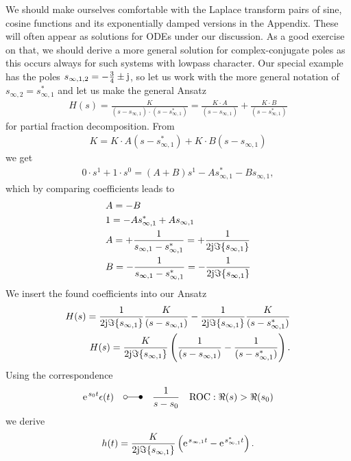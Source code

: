 \documentclass[11pt,a4paper,DIV=12]{scrartcl}
\begin{document}
We should make ourselves comfortable with the Laplace transform pairs of sine, cosine
functions and its exponentially damped versions in the Appendix.
These will often appear as solutions for ODEs under our discussion.
%
As a good exercise on that, we should derive a more general solution for
complex-conjugate poles as this occurs always for such systems
with lowpass character.
%
Our special example has the poles $s_{\infty,1,2}=-\frac{3}{4}\pm \im$, so let
us work with the more general notation of $s_{\infty,2} = s_{\infty,1}^*$
and let us make the general Ansatz
%
\begin{align}
H(s)
= \frac{K}{(s-s_{\infty,1}) \cdot (s-s_{\infty,1}^*)}
= \frac{K\cdot A}{(s-s_{\infty,1})} + \frac{K \cdot B}{(s-s_{\infty,1}^*)}
\end{align}
%
for partial fraction decomposition.
%
From
%
\begin{align}
K = K \cdot A (s-s_{\infty,1}^*) + K \cdot B (s-s_{\infty,1})
\end{align}
%
we get
\begin{align}
0 \cdot s^1 + 1 \cdot s^0=  (A+B) s^1 - A s_{\infty,1}^* - B s_{\infty,1},
\end{align}
which by comparing coefficients leads to
\begin{align}
&A = -B\\
&1 = - A s_{\infty,1}^* + A s_{\infty,1}\\
&A = +\frac{1}{s_{\infty,1} - s_{\infty,1}^*} = + \frac{1}{2 \im \Im\{s_{\infty,1}\}}\\
&B = -\frac{1}{s_{\infty,1} - s_{\infty,1}^*}= - \frac{1}{2 \im \Im\{s_{\infty,1}\}}
\end{align}
We insert the found coefficients into our Ansatz
\begin{align}
H(s) = \frac{1}{2 \im \Im\{s_{\infty,1}\}}\frac{K}{(s-s_{\infty,1})} - \frac{1}{2 \im \Im\{s_{\infty,1}\}} \frac{K}{(s-s_{\infty,1}^*)}\\
H(s) = \frac{K}{2 \im \Im\{s_{\infty,1}\}} \left(\frac{1}{(s-s_{\infty,1})} - \frac{1}{(s-s_{\infty,1}^*)}\right).
\end{align}
Using the correspondence
\begin{align}
\e^{s_0 t} \epsilon(t)\quad \laplace \quad \frac{1}{s-s_0} \quad \text{ROC}: \Re(s)>\Re(s_0)
\end{align}
we derive
\begin{align}
h(t) = \frac{K}{2 \im \Im\{s_{\infty,1}\}} \left( \e^{s_{\infty,1} t}   - \e^{s_{\infty,1}^* t} \right).
\end{align}
\end{document}
